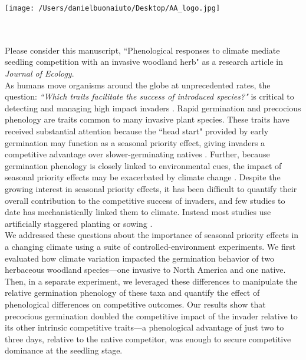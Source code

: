 \documentclass[11.5 pt]{article}
\begin{document}


\def\labelitemi{--}
\parindent=24pt
\noindent\texttt{[image: /Users/danielbuonaiuto/Desktop/AA\_logo.jpg]}
\\\\
\\
\vspace{1.5ex}

\noindent Please consider this manuscript, ``Phenological responses to climate mediate seedling competition with
an invasive woodland herb" as a research article in \textit{Journal of Ecology}.\\

\noindent As humans move organisms around the globe at unprecedented rates, the question:  \textit{``Which traits facilitate the success of introduced species?"} is critical to detecting and managing high impact invaders \citep{Fournier2019}. 
Rapid germination and precocious phenology are traits common to many invasive plant species. These traits have received substantial attention because the ``head start" provided by early germination may function as a seasonal priority effect, giving invaders a competitive advantage over slower-germinating natives \citep{Wainwright_2011}. Further, because germination phenology is closely linked to environmental cues, the impact of seasonal priority effects may be exacerbated by climate change \citep{Rudolf:2019aa}. Despite the growing interest in seasonal priority effects, it has been difficult to quantify their overall contribution to the competitive success of invaders, and few studies to date has mechanistically linked them to climate. Instead most studies use artificially staggered planting or sowing \citep{Young:2017aa}.\\

\noindent We addressed these questions about the importance of seasonal priority effects in a changing climate using a suite of controlled-environment experiments. We first evaluated how climate variation impacted the germination behavior of two herbaceous woodland species---one invasive to North America and one native. Then, in a separate experiment, we leveraged these differences to manipulate the relative germination phenology of these taxa and quantify the effect of phenological differences on competitive outcomes. Our results show that precocious germination doubled the competitive impact of the invader relative to its other intrinsic competitive traits---a phenological advantage of just two to three days, relative to the native competitor, was enough to secure competitive dominance at the seedling stage.\\
\end{document}
